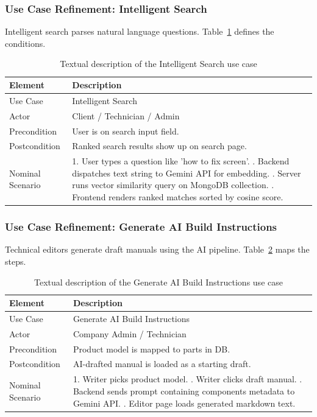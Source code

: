 \documentclass[12pt,a4paper]{report}
\begin{document}
\subsubsection{Use Case Refinement: Intelligent Search}

Intelligent search parses natural language questions. Table~\ref{tab:intel_search_desc} defines the conditions.

\begin{table}[H]
\centering
\caption{Textual description of the Intelligent Search use case}
\label{tab:intel_search_desc}
\begin{tabular}{lp{10cm}}
\toprule
\textbf{Element} & \textbf{Description} \\
\midrule
Use Case & Intelligent Search \\
Actor & Client / Technician / Admin \\
Precondition & User is on search input field. \\
Postcondition & Ranked search results show up on search page. \\
Nominal Scenario &
1. User types a question like 'how to fix screen'. \newline
2. Backend dispatches text string to Gemini API for embedding. \newline
3. Server runs vector similarity query on MongoDB collection. \newline
4. Frontend renders ranked matches sorted by cosine score. \\
\bottomrule
\end{tabular}
\end{table}

\subsubsection{Use Case Refinement: Generate AI Build Instructions}

Technical editors generate draft manuals using the AI pipeline. Table~\ref{tab:ai_build_desc} maps the steps.

\begin{table}[H]
\centering
\caption{Textual description of the Generate AI Build Instructions use case}
\label{tab:ai_build_desc}
\begin{tabular}{lp{10cm}}
\toprule
\textbf{Element} & \textbf{Description} \\
\midrule
Use Case & Generate AI Build Instructions \\
Actor & Company Admin / Technician \\
Precondition & Product model is mapped to parts in DB. \\
Postcondition & AI-drafted manual is loaded as a starting draft. \\
Nominal Scenario &
1. Writer picks product model. \newline
2. Writer clicks draft manual. \newline
3. Backend sends prompt containing components metadata to Gemini API. \newline
4. Editor page loads generated markdown text. \\
\bottomrule
\end{tabular}
\end{table}
\end{document}
